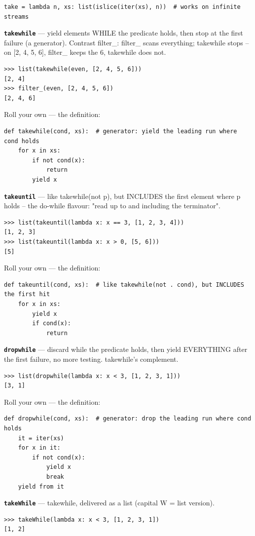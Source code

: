 \documentclass[10pt,letterpaper]{article}
\begin{document}
\begin{lstlisting}[style=ex]
take = lambda n, xs: list(islice(iter(xs), n))  # works on infinite streams
\end{lstlisting}
\textbf{\texttt{takewhile}} --- yield elements WHILE the predicate holds, then stop at the first failure (a generator). Contrast filter\_: filter\_ scans everything; takewhile stops -- on [2, 4, 5, 6], filter\_ keeps the 6, takewhile does not.
\begin{lstlisting}[style=ex]
>>> list(takewhile(even, [2, 4, 5, 6]))
[2, 4]
>>> filter_(even, [2, 4, 5, 6])
[2, 4, 6]
\end{lstlisting}

Roll your own --- the definition:

\begin{lstlisting}[style=ex]
def takewhile(cond, xs):  # generator: yield the leading run where cond holds
    for x in xs:
        if not cond(x):
            return
        yield x
\end{lstlisting}
\textbf{\texttt{takeuntil}} --- like takewhile(not p), but INCLUDES the first element where p holds -- the do-while flavour: "read up to and including the terminator".
\begin{lstlisting}[style=ex]
>>> list(takeuntil(lambda x: x == 3, [1, 2, 3, 4]))
[1, 2, 3]
>>> list(takeuntil(lambda x: x > 0, [5, 6]))
[5]
\end{lstlisting}

Roll your own --- the definition:

\begin{lstlisting}[style=ex]
def takeuntil(cond, xs):  # like takewhile(not . cond), but INCLUDES the first hit
    for x in xs:
        yield x
        if cond(x):
            return
\end{lstlisting}
\textbf{\texttt{dropwhile}} --- discard while the predicate holds, then yield EVERYTHING after the first failure, no more testing. takewhile's complement.
\begin{lstlisting}[style=ex]
>>> list(dropwhile(lambda x: x < 3, [1, 2, 3, 1]))
[3, 1]
\end{lstlisting}

Roll your own --- the definition:

\begin{lstlisting}[style=ex]
def dropwhile(cond, xs):  # generator: drop the leading run where cond holds
    it = iter(xs)
    for x in it:
        if not cond(x):
            yield x
            break
    yield from it
\end{lstlisting}
\textbf{\texttt{takeWhile}} --- takewhile, delivered as a list (capital W = list version).
\begin{lstlisting}[style=ex]
>>> takeWhile(lambda x: x < 3, [1, 2, 3, 1])
[1, 2]
\end{lstlisting}
\end{document}
